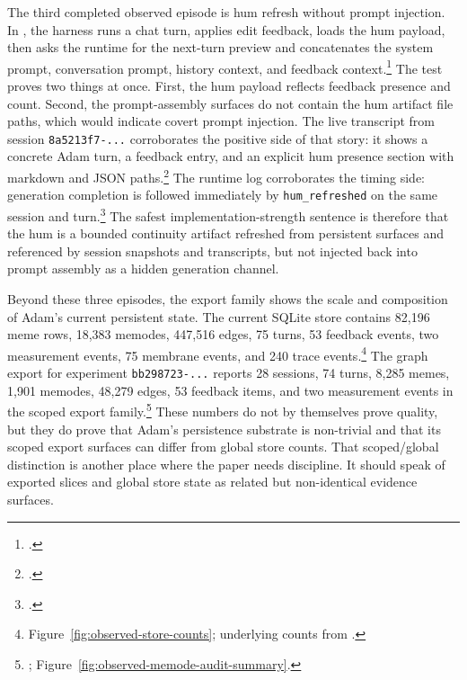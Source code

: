 \documentclass[10pt]{article}
\begin{document}
The third completed observed episode is hum refresh without prompt injection. In , the harness runs a chat turn, applies edit feedback, loads the hum payload, then asks the runtime for the next-turn preview and concatenates the system prompt, conversation prompt, history context, and feedback context.\footnote{.} The test proves two things at once. First, the hum payload reflects feedback presence and count. Second, the prompt-assembly surfaces do not contain the hum artifact file paths, which would indicate covert prompt injection. The live transcript from session \texttt{8a5213f7-...} corroborates the positive side of that story: it shows a concrete Adam turn, a feedback entry, and an explicit hum presence section with markdown and JSON paths.\footnote{.} The runtime log corroborates the timing side: generation completion is followed immediately by \texttt{hum\_refreshed} on the same session and turn.\footnote{.} The safest implementation-strength sentence is therefore that the hum is a bounded continuity artifact refreshed from persistent surfaces and referenced by session snapshots and transcripts, but not injected back into prompt assembly as a hidden generation channel.

Beyond these three episodes, the export family shows the scale and composition of Adam's current persistent state. The current SQLite store contains 82,196 meme rows, 18,383 memodes, 447,516 edges, 75 turns, 53 feedback events, two measurement events, 75 membrane events, and 240 trace events.\footnote{Figure~\ref{fig:observed-store-counts}; underlying counts from .} The graph export for experiment \texttt{bb298723-...} reports 28 sessions, 74 turns, 8,285 memes, 1,901 memodes, 48,279 edges, 53 feedback items, and two measurement events in the scoped export family.\footnote{; Figure~\ref{fig:observed-memode-audit-summary}.} These numbers do not by themselves prove quality, but they do prove that Adam's persistence substrate is non-trivial and that its scoped export surfaces can differ from global store counts. That scoped/global distinction is another place where the paper needs discipline. It should speak of exported slices and global store state as related but non-identical evidence surfaces.
\end{document}
